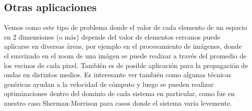\subsection{Otras aplicaciones}

Vemos como este tipo de problema donde el valor de cada elemento de un espacio en 2 dimensiones (o m\'as) depende del valor de elementos cercanos puede aplicarse en diversas \'areas, por ejemplo en el procesamiento de im\'agenes, donde el suavizado en el zoom de una im\'agen se puede realizar a trav\'es del promedio de los vecinos de cada pixel. Tambi\'en es de posible aplicaci\'on para la propagaci\'on de ondas en distintos medios. Es interesante ver tambi\'en como algunas t\'ecnicas gen\'ericas ayudan a la velocidad de c\'omputo y luego se pueden realizar optimizaciones dentro del dominio de cada sistema en particular, como fue en nuestro caso Sherman-Morrison para casos donde el sistema var\'ia levemente.
